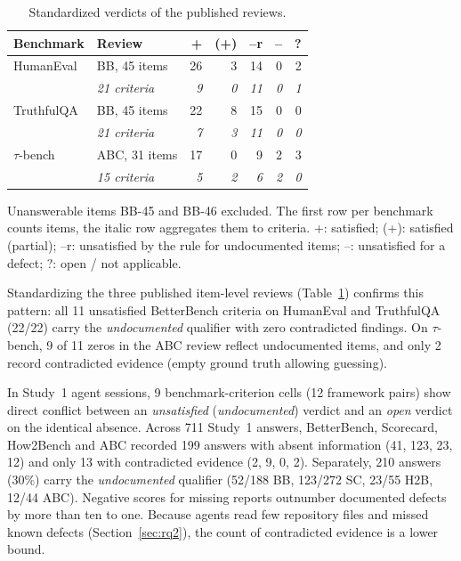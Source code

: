 \documentclass[10pt,conference]{IEEEtran}
\begin{document}
\begin{table}[t]
\caption{Standardized verdicts of the published reviews.}
\label{tab:earlier-reviews}
\centering
\footnotesize
\setlength{\tabcolsep}{2.5pt}
\begin{tabularx}{\columnwidth}{@{}l>{\raggedright\arraybackslash}Xrrrrr@{}}
\toprule
\textbf{Benchmark} & \textbf{Review} & \textbf{+} & \textbf{(+)} & \textbf{--r} & \textbf{--} & \textbf{?} \\
\midrule
HumanEval & BB, 45 items & 26 & 3 & 14 & 0 & 2 \\
 & \emph{21 criteria} & \emph{9} & \emph{0} & \emph{11} & \emph{0} & \emph{1} \\
\midrule
TruthfulQA & BB, 45 items & 22 & 8 & 15 & 0 & 0 \\
 & \emph{21 criteria} & \emph{7} & \emph{3} & \emph{11} & \emph{0} & \emph{0} \\
\midrule
$\tau$-bench & ABC, 31 items & 17 & 0 & 9 & 2 & 3 \\
 & \emph{15 criteria} & \emph{5} & \emph{2} & \emph{6} & \emph{2} & \emph{0} \\
\bottomrule
\end{tabularx}
\par\vspace{2pt}\raggedright\footnotesize Unanswerable items BB-45 and BB-46 excluded. The first row per benchmark counts items, the italic row aggregates them to criteria. +: satisfied; (+): satisfied (partial); --r: unsatisfied by the rule for undocumented items; --: unsatisfied for a defect; ?: open / not applicable.
\end{table}

Standardizing the three published item-level reviews (Table~\ref{tab:earlier-reviews}) confirms this pattern: all 11 unsatisfied BetterBench criteria on HumanEval and TruthfulQA (22/22) carry the \emph{undocumented} qualifier with zero contradicted findings. On $\tau$-bench, 9 of 11 zeros in the ABC review reflect undocumented items, and only 2 record contradicted evidence (empty ground truth allowing guessing).

In Study~1 agent sessions, 9 benchmark-criterion cells (12 framework pairs) show direct conflict between an \emph{unsatisfied} (\emph{undocumented}) verdict and an \emph{open} verdict on the identical absence. Across 711 Study~1 answers, BetterBench, Scorecard, How2Bench and ABC recorded 199 answers with absent information (41, 123, 23, 12) and only 13 with contradicted evidence (2, 9, 0, 2). Separately, 210 answers (30\%) carry the \emph{undocumented} qualifier (52/188 BB, 123/272 SC, 23/55 H2B, 12/44 ABC). Negative scores for missing reports outnumber documented defects by more than ten to one. Because agents read few repository files and missed known defects (Section~\ref{sec:rq2}), the count of contradicted evidence is a lower bound.
\end{document}
